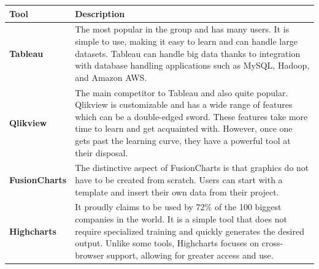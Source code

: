 \documentclass[]{book}
\begin{document}
\begin{longtable}[]{@{}ll@{}}
\toprule
\begin{minipage}[b]{0.15\columnwidth}\raggedright
\textbf{Tool}\strut
\end{minipage} & \begin{minipage}[b]{0.79\columnwidth}\raggedright
\textbf{Description}\strut
\end{minipage}\tabularnewline
\midrule
\endhead
\begin{minipage}[t]{0.15\columnwidth}\raggedright
\textbf{Tableau}\strut
\end{minipage} & \begin{minipage}[t]{0.79\columnwidth}\raggedright
The most popular in the group and has many users. It is simple to use, making it easy to learn and can handle large datasets. Tableau can handle big data thanks to integration with database handling applications such as MySQL, Hadoop, and Amazon AWS.\strut
\end{minipage}\tabularnewline
\begin{minipage}[t]{0.15\columnwidth}\raggedright
\textbf{Qlikview}\strut
\end{minipage} & \begin{minipage}[t]{0.79\columnwidth}\raggedright
The main competitor to Tableau and also quite popular. Qlikview is customizable and has a wide range of features which can be a double-edged sword. These features take more time to learn and get acquainted with. However, once one gets past the learning curve, they have a powerful tool at their disposal.\strut
\end{minipage}\tabularnewline
\begin{minipage}[t]{0.15\columnwidth}\raggedright
\textbf{FusionCharts}\strut
\end{minipage} & \begin{minipage}[t]{0.79\columnwidth}\raggedright
The distinctive aspect of FusionCharts is that graphics do not have to be created from scratch. Users can start with a template and insert their own data from their project.\strut
\end{minipage}\tabularnewline
\begin{minipage}[t]{0.15\columnwidth}\raggedright
\textbf{Highcharts}\strut
\end{minipage} & \begin{minipage}[t]{0.79\columnwidth}\raggedright
It proudly claims to be used by 72\% of the 100 biggest companies in the world. It is a simple tool that does not require specialized training and quickly generates the desired output. Unlike some tools, Highcharts focuses on cross-browser support, allowing for greater access and use.\strut

\end{minipage}
\end{longtable}
\end{document}
